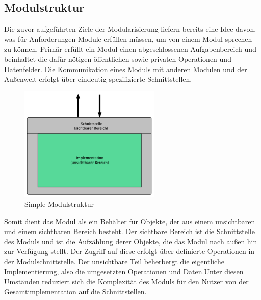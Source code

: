   \subsection{Modulstruktur}
    Die zuvor aufgeführten Ziele der Modularisierung liefern bereits eine Idee davon, was für Anforderungen Module erfüllen müssen, um von einem Modul sprechen zu können. Primär erfüllt ein Modul einen abgeschlossenen Aufgabenbereich und beinhaltet die dafür nötigen öffentlichen sowie privaten Operationen und Datenfelder. Die Kommunikation eines Moduls mit anderen Modulen und der Außenwelt erfolgt über eindeutig spezifizierte Schnittstellen.

      \begin{figure}[h!]
        \centering
        \includegraphics[width=0.6\textwidth]{material/images/simple-module.png}
        \caption{Simple Modulstruktur}
        \label{fig:simple-module}
      \end{figure} 

    Somit dient das Modul als ein Behälter für Objekte, der aus einem unsichtbaren und einem sichtbaren Bereich besteht. Der sichtbare Bereich ist die Schnittstelle des Moduls und ist die Aufzählung derer Objekte, die das Modul nach außen hin zur Verfügung stellt. Der Zugriff auf diese erfolgt über definierte Operationen in der Modulschnittstelle. Der unsichtbare Teil beherbergt die eigentliche Implementierung, also die umgesetzten Operationen und Daten.Unter diesen Umständen reduziert sich die Komplexität des Moduls für den Nutzer von der Gesamtimplementation auf die Schnittstellen. 

